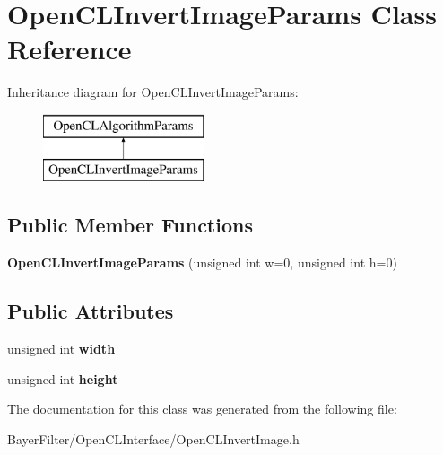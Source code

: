 \hypertarget{class_open_c_l_invert_image_params}{\section{Open\-C\-L\-Invert\-Image\-Params Class Reference}
\label{class_open_c_l_invert_image_params}
}
Inheritance diagram for Open\-C\-L\-Invert\-Image\-Params\-:\begin{figure}[H]
\begin{center}
\leavevmode
\includegraphics[height=2.000000cm]{class_open_c_l_invert_image_params}
\end{center}
\end{figure}
\subsection*{Public Member Functions}
\begin{DoxyCompactItemize}
\item 
\hypertarget{class_open_c_l_invert_image_params_a91c90f273e163715e9bcdef7102e7c30}{{\bfseries Open\-C\-L\-Invert\-Image\-Params} (unsigned int w=0, unsigned int h=0)}\label{class_open_c_l_invert_image_params_a91c90f273e163715e9bcdef7102e7c30}

\end{DoxyCompactItemize}
\subsection*{Public Attributes}
\begin{DoxyCompactItemize}
\item 
\hypertarget{class_open_c_l_invert_image_params_a594a540b91d4e7675094a68322e7b510}{unsigned int {\bfseries width}}\label{class_open_c_l_invert_image_params_a594a540b91d4e7675094a68322e7b510}

\item 
\hypertarget{class_open_c_l_invert_image_params_ad5d7e70e3c6247c600cc36921b382636}{unsigned int {\bfseries height}}\label{class_open_c_l_invert_image_params_ad5d7e70e3c6247c600cc36921b382636}

\end{DoxyCompactItemize}


The documentation for this class was generated from the following file\-:\begin{DoxyCompactItemize}
\item 
Bayer\-Filter/\-Open\-C\-L\-Interface/Open\-C\-L\-Invert\-Image.\-h\end{DoxyCompactItemize}
